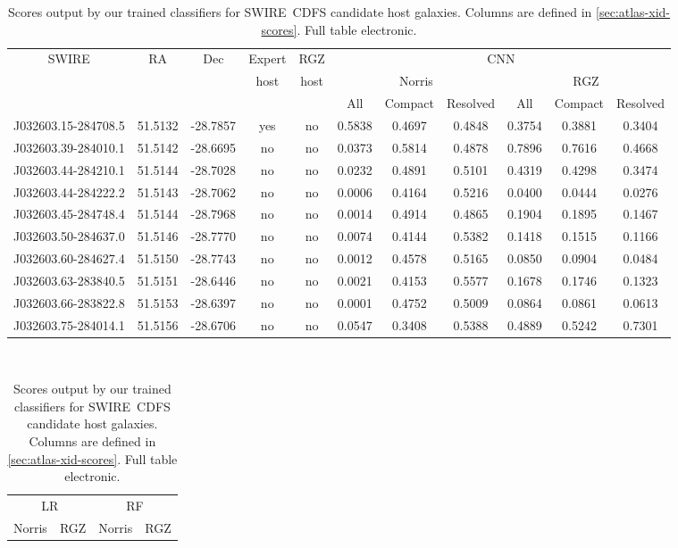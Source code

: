   \begin{table}
    \caption[Scores output by our trained classifiers for SWIRE~CDFS candidate host galaxies.]{Scores output by our trained classifiers for SWIRE~CDFS candidate host galaxies. Columns are defined in \autoref{sec:atlas-xid-scores}. Full table electronic.}
    \label{tab:cdfs-scores}
    \small\centering
    \begin{tabular}{ccccccccccc}
      \hline\hline
SWIRE & RA & Dec & Expert & RGZ & \multicolumn{6}{c}{CNN}\\
& & & host & host & \multicolumn{3}{c}{Norris} & \multicolumn{3}{c}{RGZ}\\
& & & & & All & Compact & Resolved & All & Compact & Resolved\\
      \hline
J032603.15-284708.5 & 51.5132 & -28.7857 & yes & no & 0.5838 & 0.4697 & 0.4848 & 0.3754 & 0.3881 & 0.3404 \\
J032603.39-284010.1 & 51.5142 & -28.6695 & no & no & 0.0373 & 0.5814 & 0.4878 & 0.7896 & 0.7616 & 0.4668 \\
J032603.44-284210.1 & 51.5144 & -28.7028 & no & no & 0.0232 & 0.4891 & 0.5101 & 0.4319 & 0.4298 & 0.3474 \\
J032603.44-284222.2 & 51.5143 & -28.7062 & no & no & 0.0006 & 0.4164 & 0.5216 & 0.0400 & 0.0444 & 0.0276 \\
J032603.45-284748.4 & 51.5144 & -28.7968 & no & no & 0.0014 & 0.4914 & 0.4865 & 0.1904 & 0.1895 & 0.1467 \\
J032603.50-284637.0 & 51.5146 & -28.7770 & no & no & 0.0074 & 0.4144 & 0.5382 & 0.1418 & 0.1515 & 0.1166 \\
J032603.60-284627.4 & 51.5150 & -28.7743 & no & no & 0.0012 & 0.4578 & 0.5165 & 0.0850 & 0.0904 & 0.0484 \\
J032603.63-283840.5 & 51.5151 & -28.6446 & no & no & 0.0021 & 0.4153 & 0.5577 & 0.1678 & 0.1746 & 0.1323 \\
J032603.66-283822.8 & 51.5153 & -28.6397 & no & no & 0.0001 & 0.4752 & 0.5009 & 0.0864 & 0.0861 & 0.0613 \\
J032603.75-284014.1 & 51.5156 & -28.6706 & no & no & 0.0547 & 0.3408 & 0.5388 & 0.4889 & 0.5242 & 0.7301 \\
      \hline\hline
    \end{tabular}\\
    \begin{tabular}{cccccccccccc}
      \hline\hline
\multicolumn{6}{c}{LR} & \multicolumn{6}{c}{RF} \\
\multicolumn{3}{c}{Norris} & \multicolumn{3}{c}{RGZ} & \multicolumn{3}{c}{Norris} & \multicolumn{3}{c}{RGZ} \\

\end{tabular}
\end{table}
